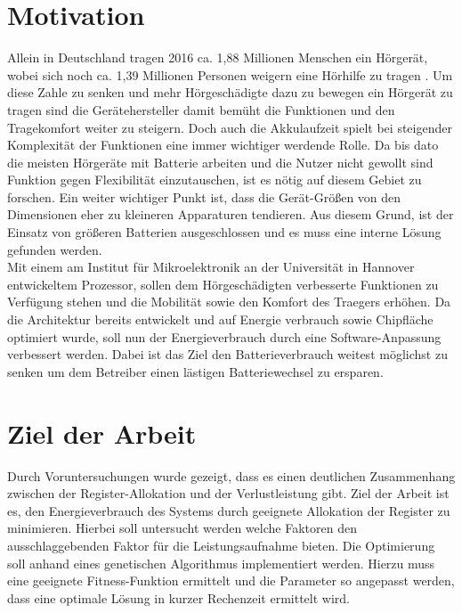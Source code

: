 \section{Motivation}
\label{sec:motivation}
Allein in Deutschland tragen 2016 ca. 1,88 Millionen Menschen ein Hörgerät, wobei sich noch ca. 1,39 Millionen Personen weigern eine Hörhilfe zu tragen  \cite{statistica}. Um diese Zahle zu senken und mehr Hörgeschädigte dazu zu bewegen ein Hörgerät zu tragen sind die Gerätehersteller damit bemüht die Funktionen und den Tragekomfort weiter zu steigern. Doch auch die Akkulaufzeit spielt bei steigender Komplexität der Funktionen eine immer wichtiger werdende Rolle. Da bis dato die meisten Hörgeräte mit Batterie arbeiten und die Nutzer nicht gewollt sind Funktion gegen Flexibilität einzutauschen, ist es nötig auf diesem Gebiet zu forschen. Ein weiter wichtiger Punkt ist, dass die Gerät-Größen von den Dimensionen eher zu kleineren Apparaturen tendieren. Aus diesem Grund, ist der Einsatz von größeren Batterien ausgeschlossen und es muss eine interne Lösung gefunden werden.\\
Mit einem am Institut für Mikroelektronik an der Universität in Hannover entwickeltem Prozessor, sollen dem Hörgeschädigten verbesserte Funktionen zu Verfügung stehen und die Mobilität sowie den Komfort des Traegers erhöhen. Da die Architektur bereits entwickelt und auf Energie verbrauch sowie Chipfläche optimiert wurde, soll nun der Energieverbrauch durch eine Software-Anpassung verbessert werden.
Dabei ist das Ziel den Batterieverbrauch weitest möglichst zu senken um dem Betreiber einen lästigen Batteriewechsel zu ersparen.


\section{Ziel der Arbeit}
\label{sec:ziele}
Durch Voruntersuchungen wurde gezeigt, dass es einen deutlichen Zusammenhang zwischen der Register-Allokation und der Verlustleistung gibt. Ziel der Arbeit ist es, den Energieverbrauch des Systems durch geeignete Allokation der Register zu minimieren. Hierbei soll untersucht werden welche Faktoren den ausschlaggebenden Faktor für die Leistungsaufnahme bieten. Die Optimierung soll anhand eines genetischen Algorithmus implementiert werden. Hierzu muss eine geeignete Fitness-Funktion ermittelt und die Parameter so angepasst werden, dass eine optimale Lösung in kurzer Rechenzeit ermittelt wird.


